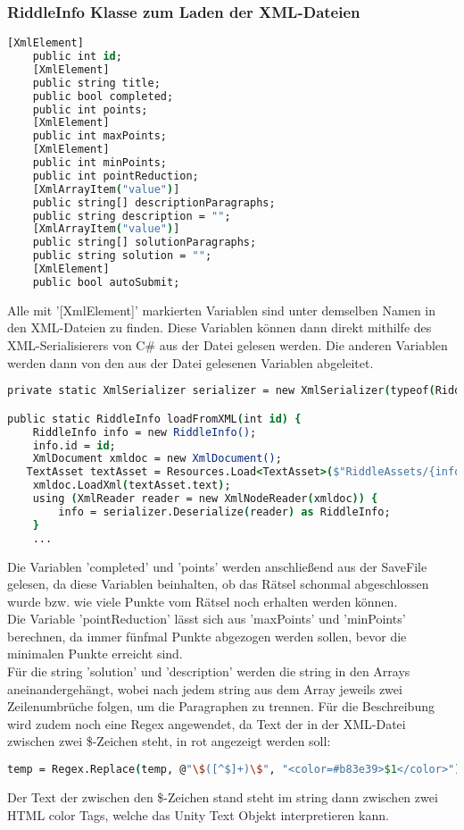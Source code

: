 \subsubsection{RiddleInfo Klasse zum Laden der XML-Dateien}
\label{sub:RiddleInfo}
\begin{lstlisting}[language=csh, caption={In der Klasse gespeicherte Daten}]
	[XmlElement]
    public int id;
    [XmlElement]
    public string title;
    public bool completed;
    public int points;
    [XmlElement]
    public int maxPoints;
    [XmlElement]
    public int minPoints;
    public int pointReduction;
    [XmlArrayItem("value")]
    public string[] descriptionParagraphs;
    public string description = "";
    [XmlArrayItem("value")]
    public string[] solutionParagraphs;
    public string solution = "";
    [XmlElement]
    public bool autoSubmit;
\end{lstlisting}
Alle mit '[XmlElement]' markierten Variablen sind unter demselben Namen in den XML-Dateien zu finden. Diese Variablen können dann direkt mithilfe des XML-Serialisierers von C\# aus der Datei gelesen werden. Die anderen Variablen werden dann von den aus der Datei gelesenen Variablen abgeleitet.\\
\begin{lstlisting}[language=csh, caption={Laden der Daten mit dem XML-Serialisierer}]
private static XmlSerializer serializer = new XmlSerializer(typeof(RiddleInfo));

public static RiddleInfo loadFromXML(int id) {
    RiddleInfo info = new RiddleInfo();
    info.id = id;
    XmlDocument xmldoc = new XmlDocument();
   TextAsset textAsset = Resources.Load<TextAsset>($"RiddleAssets/{info.id.ToString("000")}/info");
    xmldoc.LoadXml(textAsset.text);
    using (XmlReader reader = new XmlNodeReader(xmldoc)) {
        info = serializer.Deserialize(reader) as RiddleInfo;
    }
    ...
\end{lstlisting}
Die Variablen 'completed' und 'points' werden anschließend aus der SaveFile gelesen, da diese Variablen beinhalten, ob das Rätsel schonmal abgeschlossen wurde bzw. wie viele Punkte vom Rätsel noch erhalten werden können.\\
Die Variable 'pointReduction' lässt sich aus 'maxPoints' und 'minPoints' berechnen, da immer fünfmal Punkte abgezogen werden sollen, bevor die minimalen Punkte erreicht sind.\\
Für die string 'solution' und 'description' werden die string in den Arrays aneinandergehängt, wobei nach jedem string aus dem Array jeweils zwei Zeilenumbrüche folgen, um die Paragraphen zu trennen. Für die Beschreibung wird zudem noch eine Regex angewendet, da Text der in der XML-Datei zwischen zwei \$-Zeichen steht, in rot angezeigt werden soll:
\begin{lstlisting}[language=csh, caption={Regex um Text zwischen \$-Zeichen rot zu färben}]
temp = Regex.Replace(temp, @"\$([^$]+)\$", "<color=#b83e39>$1</color>");
\end{lstlisting}
Der Text der zwischen den \$-Zeichen stand steht im string dann zwischen zwei HTML color Tags, welche das Unity Text Objekt interpretieren kann.\\


